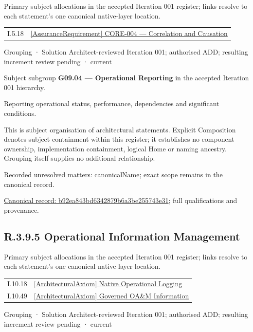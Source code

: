 Primary subject allocations in the accepted Iteration 001 register; links resolve to each statement’s one canonical native-layer location.\par
\begin{longtable}{p{.22\linewidth}p{.73\linewidth}}
I.5.18 & \hyperref[element:f2e504e7d6374e41a81303265adda6de]{[AssuranceRequirement] CORE-004 — Correlation and Causation} \\
\end{longtable}
\label{element:b92ea843bd6342879b6a3be255743e31}
{\small Grouping · Solution Architect-reviewed Iteration 001; authorised ADD; resulting increment review pending · current}\par

Subject subgroup \textbf{G09.04 — Operational Reporting} in the accepted Iteration 001 hierarchy.



Reporting operational status, performance, dependencies and significant conditions.



This is subject organisation of architectural statements. Explicit Composition denotes subject containment within this register; it establishes no component ownership, implementation containment, logical Home or naming ancestry. Grouping itself supplies no additional relationship.


{\small Recorded unresolved matters: canonicalName; exact scope remains in the canonical record.}\par
{\footnotesize \href{../../../../continuum/grouping/b92ea843bd6342879b6a3be255743e31.md}{Canonical record: b92ea843bd6342879b6a3be255743e31}; full qualifications and provenance.}\par
\subsection*{R.3.9.5 Operational Information Management}
\label{navigation:R.3.9.5}

Primary subject allocations in the accepted Iteration 001 register; links resolve to each statement’s one canonical native-layer location.\par
\begin{longtable}{p{.22\linewidth}p{.73\linewidth}}
I.10.18 & \hyperref[element:9d094b1b42644ab5aa2071a9460778e2]{[ArchitecturalAxiom] Native Operational Logging} \\
I.10.49 & \hyperref[element:43593f7a9566410ebc1aa30dbe935848]{[ArchitecturalAxiom] Governed OA\&M Information} \\
\end{longtable}
\label{element:da5b4238bd6945cf9b467ff3feb9d76b}
{\small Grouping · Solution Architect-reviewed Iteration 001; authorised ADD; resulting increment review pending · current}\par

